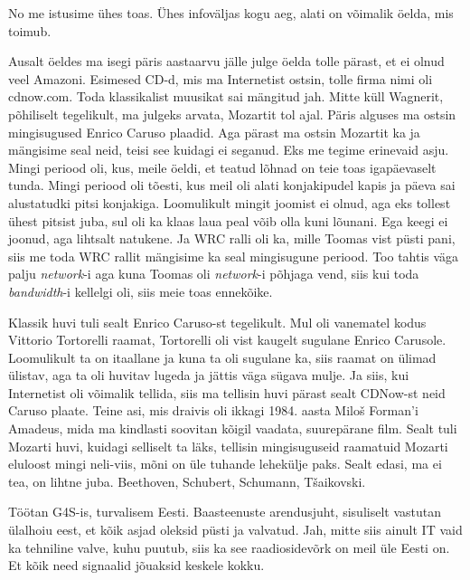 
No me istusime ühes toas. Ühes infoväljas kogu aeg, alati on võimalik öelda, 
mis toimub.


Ausalt öeldes ma isegi päris aastaarvu jälle julge öelda tolle pärast, et ei 
olnud veel Amazoni. Esimesed CD-d, mis ma Internetist ostsin, tolle firma nimi 
oli cdnow.com. Toda klassikalist muusikat sai mängitud jah. Mitte küll 
Wagnerit, põhiliselt tegelikult, ma julgeks arvata, Mozartit tol ajal. Päris 
alguses ma ostsin mingisugused Enrico Caruso plaadid. Aga pärast ma ostsin 
Mozartit ka ja mängisime seal neid, teisi see kuidagi ei seganud. Eks me tegime 
erinevaid asju. Mingi periood oli, kus, meile öeldi, et teatud lõhnad on teie 
toas igapäevaselt tunda. Mingi periood oli tõesti, kus meil oli alati 
konjakipudel kapis  ja päeva sai alustatudki pitsi konjakiga. Loomulikult 
mingit joomist ei olnud, aga eks tollest ühest pitsist juba, sul oli ka klaas 
laua peal võib olla kuni lõunani. Ega keegi ei joonud, aga lihtsalt natukene. 
Ja WRC ralli oli ka, mille Toomas vist püsti pani, siis me toda WRC rallit 
mängisime ka seal mingisugune periood. Too tahtis väga palju \emph{network}-i 
aga kuna Toomas oli \emph{network}-i põhjaga vend, siis kui toda 
\emph{bandwidth}-i kellelgi oli, siis meie toas ennekõike.


Klassik huvi tuli sealt Enrico Caruso-st tegelikult. Mul oli vanematel kodus 
Vittorio Tortorelli raamat, Tortorelli  oli vist kaugelt sugulane Enrico 
Carusole. Loomulikult ta on itaallane ja kuna ta oli sugulane ka, siis raamat 
on ülimad ülistav, aga ta oli huvitav lugeda ja jättis väga sügava mulje. Ja 
siis, kui Internetist  oli võimalik tellida, siis ma tellisin huvi pärast sealt 
CDNow-st neid Caruso plaate. Teine asi, mis draivis oli ikkagi 1984. aasta 
Miloš Forman'i Amadeus, mida ma kindlasti soovitan kõigil vaadata, suurepärane 
film. Sealt tuli Mozarti huvi, kuidagi selliselt ta läks,  tellisin 
mingisuguseid raamatuid Mozarti eluloost mingi neli-viis, mõni on üle tuhande 
lehekülje paks. Sealt edasi, ma ei tea, on lihtne juba. Beethoven, Schubert, 
Schumann, Tšaikovski. 


Töötan G4S-is, turvalisem Eesti. Baasteenuste arendusjuht,  
sisuliselt  vastutan ülalhoiu eest, et kõik asjad oleksid püsti ja valvatud. 
Jah, mitte siis ainult IT vaid ka  tehniline valve, kuhu puutub, siis ka see 
raadiosidevõrk on meil üle Eesti on. Et kõik need signaalid jõuaksid  keskele 
kokku.
